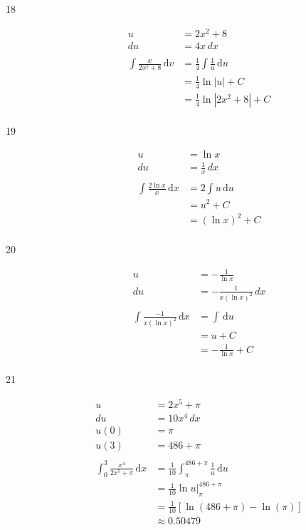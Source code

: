 \documentclass{exam}
\begin{document}
\begin{description}
\item[18]
\begin{align*}
  u &= 2x^2 + 8 \\
  du &= 4x \, dx \\
\\
  \int \frac{x}{2x^2 + 8} \, \mathrm{d}v &= \frac{1}{4} \int \frac{1}{u} \, \mathrm{d}u \\
  &= \frac{1}{4} \ln |u| + C \\
  &= \frac{1}{4} \ln | 2x^2 + 8 | + C \\
\end{align*}

\item[19]
\begin{align*}
  u &= \ln x \\
  du &= \frac{1}{x} \, dx \\
\\
  \int \frac{2 \ln x}{x} \, \mathrm{d}x &= 2 \int u \, \mathrm{d}u \\
  &= u^2 + C \\
  &= (\ln x)^2 + C \\
\end{align*}

\item[20]
\begin{align*}
  u &= - \frac{1}{\ln x} \\
  du &= - \frac{1}{x (\ln x)^2} \, dx \\
\\
  \int \frac{-1}{x (\ln x)^2} \, \mathrm{d}x &= \int \, \mathrm{d}u \\
  &= u + C \\
  &= - \frac{1}{\ln x} + C \\
\end{align*}

\item[21]
\begin{align*}
  u &= 2x^5 + \pi \\
  du &= 10x^4 \, dx \\
  u(0) &= \pi \\
  u(3) &= 486 + \pi \\
\\
  \int_0^3 \frac{x^4}{2x^5 + \pi} \, \mathrm{d}x &= \frac{1}{10} \int_{\pi}^{486 + \pi} \frac{1}{u} \, \mathrm{d}u \\
  &= \frac{1}{10} \ln u \bigg|_{\pi}^{486 + \pi} \\
  &= \frac{1}{10} [ \ln(486 + \pi) - \ln(\pi) ] \\
  &\approx 0.50479 \\
\end{align*}


\end{description}
\end{document}
